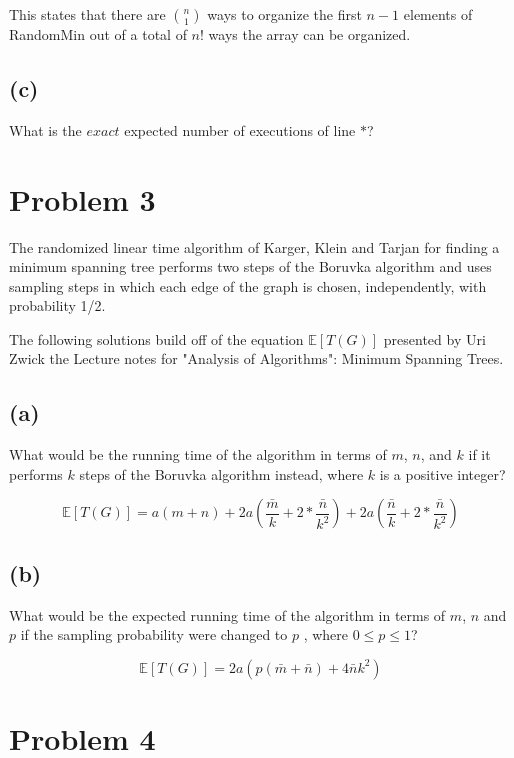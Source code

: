 \documentclass[12pt]{article}
\begin{document}
This states that there are $\binom{n}{1}$ ways to organize the first $n
- 1$ elements of RandomMin out of a total of $n!$ ways the array can be
organized.

\subsection*{(c)}
What is the $exact$ expected number of executions of line \(*\)?


\section*{Problem 3}
The randomized linear time algorithm of Karger, Klein and Tarjan for
finding a minimum spanning tree performs two steps of the Boruvka
algorithm and uses sampling steps in which each edge of the graph is
chosen, independently, with probability 1/2.\newline

The following solutions build off of the equation $\mathbb{E}[T(G)]$
presented by Uri Zwick the Lecture notes for "Analysis of
Algorithms": Minimum Spanning Trees.


\subsection*{(a)}
What would be the running time of the algorithm in terms of $m$, $n$,
and $k$ if it performs $k$ steps of the Boruvka algorithm instead,
where $k$ is a positive integer?

\begin{equation*}
    \mathbb{E}[T(G)] = a(m + n) + 2a(\frac{\bar{m}}{k} + 2 * \frac{\bar{n}}{k^2}) +
    2a(\frac{\bar{n}}{k} + 2 * \frac{\bar{n}}{k^2})
\end{equation*}

\subsection*{(b)}
 What would be the expected running time of the algorithm in terms of
 $m$, $n$ and $p$ if the sampling probability were changed to $p$ ,
 where $0 \le p \le 1$?

\begin{equation*}
    \mathbb{E}[T(G)] = 2a(p(\bar{m} + \bar{n}) + 4 \bar{n} k^2)
\end{equation*}


\pagebreak

\section*{Problem 4}
\end{document}
